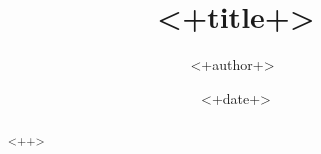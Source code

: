 \documentclass[aps,showpacs,showkeys,superscriptaddress]{revtex4-2}
\begin{document}
\title{<+title+>}

\author{<+author+> \,  }
\date{<+date+>}
\begin{abstract}
    <++>
\end{abstract}
\pacs{<++>; <++>}
\keywords{<++>, <++>}
\maketitle




\end{document}
